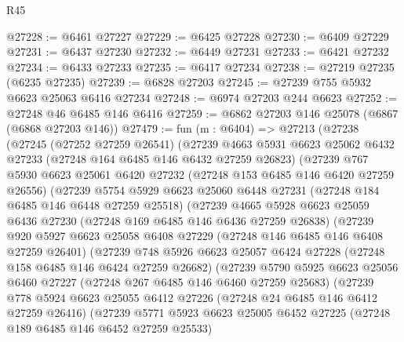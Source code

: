 \begin{lexlean}{R45}
\begin{coremodule}
{@27228 := @6461 @27227
@27229 := @6425 @27228
@27230 := @6409 @27229
@27231 := @6437 @27230
@27232 := @6449 @27231
@27233 := @6421 @27232
@27234 := @6433 @27233
@27235 := @6417 @27234
@27238 := @27219 @27235 (@6235 @27235)
@27239 := @6828 @27203
@27245 := @27239 @755 @5932 @6623 @25063 @6416 @27234
@27248 := @6974 @27203 @244 @6623
@27252 := @27248 @46 @6485 @146 @6416
@27259 := @6862 @27203 @146 @25078 (@6867 (@6868 @27203 @146))
@27479 := fun (m : @6404) =>
  @27213
    (@27238
      (@27245
        (@27252 @27259 @26541)
        (@27239
          @4663
          @5931
          @6623
          @25062
          @6432
          @27233
          (@27248 @164 @6485 @146 @6432 @27259 @26823)
          (@27239
            @767
            @5930
            @6623
            @25061
            @6420
            @27232
            (@27248 @153 @6485 @146 @6420 @27259 @26556)
            (@27239
              @5754
              @5929
              @6623
              @25060
              @6448
              @27231
              (@27248 @184 @6485 @146 @6448 @27259 @25518)
              (@27239
                @4665
                @5928
                @6623
                @25059
                @6436
                @27230
                (@27248 @169 @6485 @146 @6436 @27259 @26838)
                (@27239
                  @920
                  @5927
                  @6623
                  @25058
                  @6408
                  @27229
                  (@27248 @146 @6485 @146 @6408 @27259 @26401)
                  (@27239
                    @748
                    @5926
                    @6623
                    @25057
                    @6424
                    @27228
                    (@27248 @158 @6485 @146 @6424 @27259 @26682)
                    (@27239
                      @5790
                      @5925
                      @6623
                      @25056
                      @6460
                      @27227
                      (@27248 @267 @6485 @146 @6460 @27259 @25683)
                      (@27239
                        @778
                        @5924
                        @6623
                        @25055
                        @6412
                        @27226
                        (@27248 @24 @6485 @146 @6412 @27259 @26416)
                        (@27239
                          @5771
                          @5923
                          @6623
                          @25005
                          @6452
                          @27225
                          (@27248 @189 @6485 @146 @6452 @27259 @25533)
}
\end{coremodule}
\end{lexlean}
